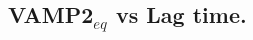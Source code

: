 \documentclass{article}
\begin{document}





\subsection{VAMP2$_{eq}$ vs Lag time.}
\end{document}
